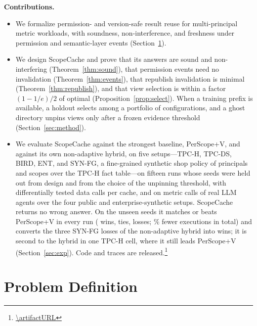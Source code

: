 \documentclass[sigconf, nonacm]{acmart}
\newcommand{\M}[1]{\textsf{#1}}
\begin{document}
\textbf{Contributions.}
\begin{itemize}
\item We formalize permission- and version-safe result reuse for multi-principal metric workloads, with soundness, non-interference, and freshness under permission and semantic-layer events (Section~\ref{sec:problem}).
\item We design ScopeCache and prove that its answers are sound and non-interfering (Theorem~\ref{thm:sound}), that permission events need no invalidation (Theorem~\ref{thm:events}), that republish invalidation is minimal (Theorem~\ref{thm:republish}), and that view selection is within a factor $(1-1/e)/2$ of optimal (Proposition~\ref{prop:select}). When a training prefix is available, a holdout selects among a portfolio of configurations, and a ghost directory unpins views only after a frozen evidence threshold (Section~\ref{sec:method}).
\item We evaluate ScopeCache against the strongest baseline, \M{PerScope+V}, and against its own non-adaptive hybrid, on five setups---TPC-H, TPC-DS, BIRD, ENT, and SYN-FG, a fine-grained synthetic shop policy of \synfgUsers{} principals and \synfgScopes{} scopes over the TPC-H fact table---on fifteen runs whose seeds were held out from design and from the choice of the unpinning threshold, with \freshDataCalls{} differentially tested data calls per cache, and on \nAgentCalls{} metric calls of real LLM agents over the four public and enterprise-synthetic setups. ScopeCache returns no wrong answer. On the unseen seeds it matches or beats \M{PerScope+V} in every run (\psvW{} wins, \psvT{} ties, \psvL{} losses; \freshRedTot\% fewer executions in total) and converts the three SYN-FG losses of the non-adaptive hybrid into wins; it is second to the hybrid in one TPC-H cell, where it still leads \M{PerScope+V} (Section~\ref{sec:exp}). Code and traces are released.\footnote{\url{\artifactURL}}
\end{itemize}

\section{Problem Definition}
\label{sec:problem}
\end{document}
